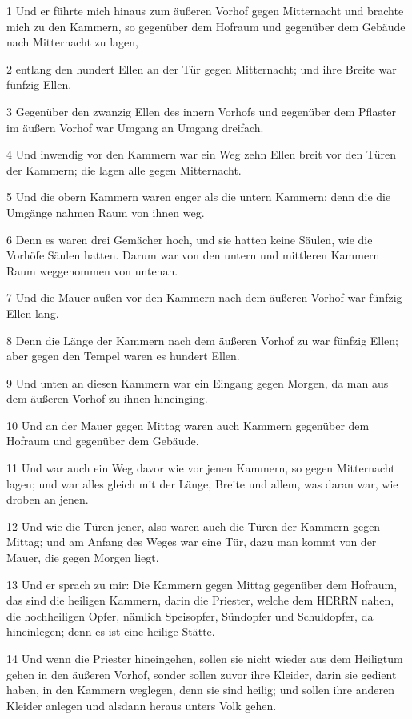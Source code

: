 \par 1 Und er führte mich hinaus zum äußeren Vorhof gegen Mitternacht und brachte mich zu den Kammern, so gegenüber dem Hofraum und gegenüber dem Gebäude nach Mitternacht zu lagen,
\par 2 entlang den hundert Ellen an der Tür gegen Mitternacht; und ihre Breite war fünfzig Ellen.
\par 3 Gegenüber den zwanzig Ellen des innern Vorhofs und gegenüber dem Pflaster im äußern Vorhof war Umgang an Umgang dreifach.
\par 4 Und inwendig vor den Kammern war ein Weg zehn Ellen breit vor den Türen der Kammern; die lagen alle gegen Mitternacht.
\par 5 Und die obern Kammern waren enger als die untern Kammern; denn die die Umgänge nahmen Raum von ihnen weg.
\par 6 Denn es waren drei Gemächer hoch, und sie hatten keine Säulen, wie die Vorhöfe Säulen hatten. Darum war von den untern und mittleren Kammern Raum weggenommen von untenan.
\par 7 Und die Mauer außen vor den Kammern nach dem äußeren Vorhof war fünfzig Ellen lang.
\par 8 Denn die Länge der Kammern nach dem äußeren Vorhof zu war fünfzig Ellen; aber gegen den Tempel waren es hundert Ellen.
\par 9 Und unten an diesen Kammern war ein Eingang gegen Morgen, da man aus dem äußeren Vorhof zu ihnen hineinging.
\par 10 Und an der Mauer gegen Mittag waren auch Kammern gegenüber dem Hofraum und gegenüber dem Gebäude.
\par 11 Und war auch ein Weg davor wie vor jenen Kammern, so gegen Mitternacht lagen; und war alles gleich mit der Länge, Breite und allem, was daran war, wie droben an jenen.
\par 12 Und wie die Türen jener, also waren auch die Türen der Kammern gegen Mittag; und am Anfang des Weges war eine Tür, dazu man kommt von der Mauer, die gegen Morgen liegt.
\par 13 Und er sprach zu mir: Die Kammern gegen Mittag gegenüber dem Hofraum, das sind die heiligen Kammern, darin die Priester, welche dem HERRN nahen, die hochheiligen Opfer, nämlich Speisopfer, Sündopfer und Schuldopfer, da hineinlegen; denn es ist eine heilige Stätte.
\par 14 Und wenn die Priester hineingehen, sollen sie nicht wieder aus dem Heiligtum gehen in den äußeren Vorhof, sonder sollen zuvor ihre Kleider, darin sie gedient haben, in den Kammern weglegen, denn sie sind heilig; und sollen ihre anderen Kleider anlegen und alsdann heraus unters Volk gehen.
